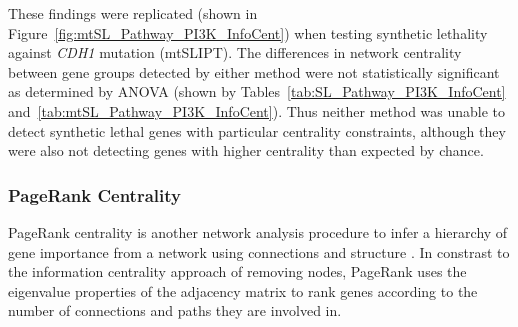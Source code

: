 \FloatBarrier

\begin{table*}[!htb]
\caption{\gls{ANOVA} for Synthetic Lethality and Information Centrality}
\label{tab:SL_Pathway_PI3K_InfoCent}
\noindent{}
\end{table*}

These findings were replicated (shown in Figure~\ref{fig:mtSL_Pathway_PI3K_InfoCent}) when testing synthetic lethality against \textit{CDH1} mutation (mtSLIPT). The differences in network centrality between gene groups detected by either method were not statistically significant as determined by \gls{ANOVA} (shown by Tables~\ref{tab:SL_Pathway_PI3K_InfoCent} and~\ref{tab:mtSL_Pathway_PI3K_InfoCent}). Thus neither method was unable to detect synthetic lethal genes with particular centrality constraints, although they were also not detecting genes with higher centrality than expected by chance.



\FloatBarrier

\subsubsection{PageRank Centrality}  \label{chapt4:Network_PageRank}

\FloatBarrier

PageRank centrality is another network analysis procedure to infer a hierarchy of gene importance from a network using connections and structure \citep{Brin1998}. In constrast to the information centrality approach of removing nodes, PageRank uses the eigenvalue properties of the adjacency matrix to rank genes according to the number of connections and paths they are involved in. 

